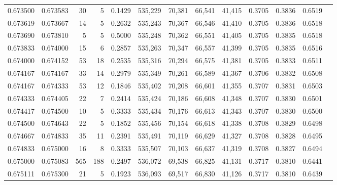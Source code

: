 \begin{tabular}{rrrrrrrrrrrrr}
0.673500 & 0.673583 &    30 &   5 &                                     0.1429 & 535,229 &  70,381 &  66,541 &  41,415 & 0.3705 & 0.3836 & 0.6519 \\
0.673619 & 0.673667 &    14 &   5 &                                     0.2632 & 535,243 &  70,367 &  66,546 &  41,410 & 0.3705 & 0.3836 & 0.6518 \\
0.673690 & 0.673810 &     5 &   5 &                                     0.5000 & 535,248 &  70,362 &  66,551 &  41,405 & 0.3705 & 0.3835 & 0.6518 \\
0.673833 & 0.674000 &    15 &   6 &                                     0.2857 & 535,263 &  70,347 &  66,557 &  41,399 & 0.3705 & 0.3835 & 0.6516 \\
0.674000 & 0.674152 &    53 &  18 &                                     0.2535 & 535,316 &  70,294 &  66,575 &  41,381 & 0.3705 & 0.3833 & 0.6511 \\
0.674167 & 0.674167 &    33 &  14 &                                     0.2979 & 535,349 &  70,261 &  66,589 &  41,367 & 0.3706 & 0.3832 & 0.6508 \\
0.674167 & 0.674333 &    53 &  12 &                                     0.1846 & 535,402 &  70,208 &  66,601 &  41,355 & 0.3707 & 0.3831 & 0.6503 \\
0.674333 & 0.674405 &    22 &   7 &                                     0.2414 & 535,424 &  70,186 &  66,608 &  41,348 & 0.3707 & 0.3830 & 0.6501 \\
0.674417 & 0.674500 &    10 &   5 &                                     0.3333 & 535,434 &  70,176 &  66,613 &  41,343 & 0.3707 & 0.3830 & 0.6500 \\
0.674500 & 0.674643 &    22 &   5 &                                     0.1852 & 535,456 &  70,154 &  66,618 &  41,338 & 0.3708 & 0.3829 & 0.6498 \\
0.674667 & 0.674833 &    35 &  11 &                                     0.2391 & 535,491 &  70,119 &  66,629 &  41,327 & 0.3708 & 0.3828 & 0.6495 \\
0.674833 & 0.675000 &    16 &   8 &                                     0.3333 & 535,507 &  70,103 &  66,637 &  41,319 & 0.3708 & 0.3827 & 0.6494 \\
0.675000 & 0.675083 &   565 & 188 &                                     0.2497 & 536,072 &  69,538 &  66,825 &  41,131 & 0.3717 & 0.3810 & 0.6441 \\
0.675111 & 0.675300 &    21 &   5 &                                     0.1923 & 536,093 &  69,517 &  66,830 &  41,126 & 0.3717 & 0.3810 & 0.6439 \\

\end{tabular}
